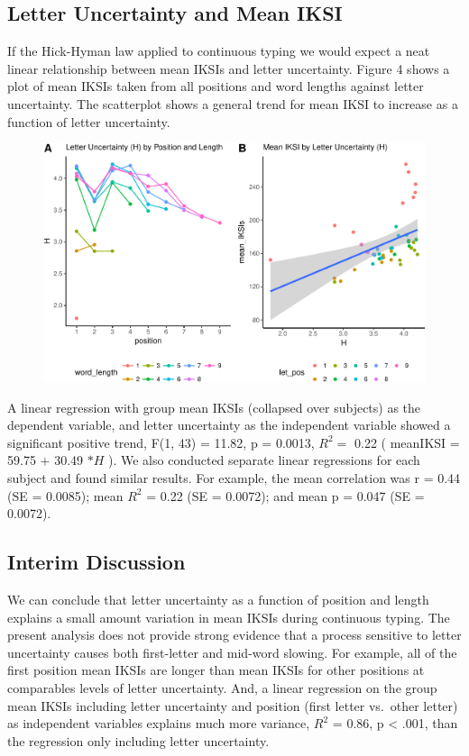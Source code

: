 \documentclass[floatsintext,man]{apa6}
\theoremstyle{definition}
\theoremstyle{definition}
\theoremstyle{definition}
\theoremstyle{remark}
\begin{document}
\subsection{Letter Uncertainty and Mean
IKSI}\label{letter-uncertainty-and-mean-iksi}

If the Hick-Hyman law applied to continuous typing we would expect a
neat linear relationship between mean IKSIs and letter uncertainty.
Figure 4 shows a plot of mean IKSIs taken from all positions and word
lengths against letter uncertainty. The scatterplot shows a general
trend for mean IKSI to increase as a function of letter uncertainty.

\begin{figure}[htbp]
\centering
\includegraphics{Entropy_typing_draft_files/figure-latex/letter_uncertainty_by_IKSI-1.pdf}
\caption{}
\end{figure}

A linear regression with group mean IKSIs (collapsed over subjects) as
the dependent variable, and letter uncertainty as the independent
variable showed a significant positive trend, F(1, 43) = 11.82, p =
0.0013, \(R^2 =\) 0.22 ( meanIKSI = 59.75 \(+\) 30.49 \(* H\) ). We also
conducted separate linear regressions for each subject and found similar
results. For example, the mean correlation was r = 0.44 (SE = 0.0085);
mean \(R^2\) = 0.22 (SE = 0.0072); and mean p = 0.047 (SE = 0.0072).

\subsection{Interim Discussion}\label{interim-discussion}

We can conclude that letter uncertainty as a function of position and
length explains a small amount variation in mean IKSIs during continuous
typing. The present analysis does not provide strong evidence that a
process sensitive to letter uncertainty causes both first-letter and
mid-word slowing. For example, all of the first position mean IKSIs are
longer than mean IKSIs for other positions at comparables levels of
letter uncertainty. And, a linear regression on the group mean IKSIs
including letter uncertainty and position (first letter vs.~other
letter) as independent variables explains much more variance, \(R^2\) =
0.86, p \textless{} .001, than the regression only including letter
uncertainty.
\end{document}
